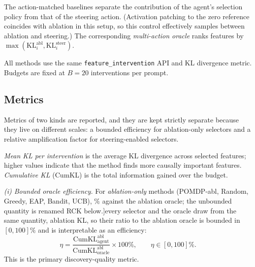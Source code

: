 The action-matched baselines separate the contribution of the agent's selection
policy from that of the steering action.   (Activation patching to the zero reference
coincides with ablation in this setup, so this control effectively samples between
ablation and steering.) The
corresponding \emph{multi-action oracle} ranks features by
$\max(\text{KL}^{\text{abl}}_i,\text{KL}^{\text{steer}}_i)$.

All methods use the same \texttt{feature\_intervention} API and
KL divergence metric.  Budgets are fixed at $B=20$ interventions
per prompt.

\subsection{Metrics}

Metrics of two kinds are reported, and they are kept
strictly separate because they live on different scales: a bounded efficiency for
ablation-only selectors and a relative amplification factor for steering-enabled
selectors.

\emph{Mean KL per intervention} is the average KL divergence across selected
features; higher values indicate that the method finds more causally important
features. \emph{Cumulative KL} (CumKL) is the total information gained over the
budget.

\emph{(i) Bounded oracle efficiency.} For \emph{ablation-only} methods (POMDP-abl,
Random, Greedy, EAP, Bandit, UCB), \RoneHl[R1.2 (Oracle efficiency >100\%): values such as 1255\% are confusing for an upper bound; explain mathematically or rename. Resolved: ablation-only efficiency is bounded in [0,100]\% against the ablation oracle; the unbounded quantity is renamed RCK below.]{every selector and the oracle draw from the same
quantity, ablation KL, so their ratio to the ablation oracle is bounded in
$[0,100]\%$ and is interpretable as an efficiency:}
\begin{equation}
  \label{eq:oracle_eff}
  \eta = \frac{\text{CumKL}^{\text{abl}}_{\text{agent}}}
              {\text{CumKL}^{\text{abl}}_{\text{oracle}}} \times 100\%,
  \qquad \eta \in [0,100]\%.
\end{equation}
This is the primary discovery-quality metric.

